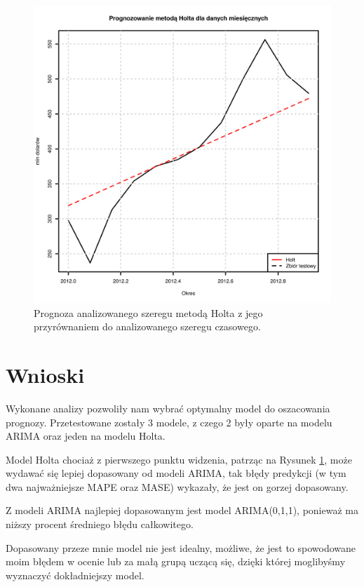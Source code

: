 \documentclass[11pt]{article}
\begin{document}
\begin{figure}[h]
    \centering
	\includegraphics[width=\textwidth]{images/holt.png}
    \caption{Prognoza analizowanego szeregu metodą Holta z jego przyrównaniem do analizowanego szeregu czasowego.}
    \label{fig:holt}

\end{figure}

\newpage

\section{Wnioski}

Wykonane analizy pozwoliły nam wybrać optymalny model do oszacowania prognozy. Przetestowane zostały 3 modele, z czego 2 były oparte na modelu ARIMA oraz jeden na modelu Holta.

Model Holta chociaż z pierwszego punktu widzenia, patrząc na Rysunek \ref{fig:holt}, może wydawać się lepiej dopasowany od modeli ARIMA, tak błędy predykcji (w tym dwa najważniejsze MAPE oraz MASE) wykazały, że jest on gorzej dopasowany.

Z modeli ARIMA najlepiej dopasowanym jest model ARIMA(0,1,1), ponieważ ma niższy procent średniego błędu całkowitego. 

Dopasowany przeze mnie model nie jest idealny, możliwe, że jest to spowodowane moim błędem w ocenie lub za małą grupą uczącą się, dzięki której moglibyśmy wyznaczyć dokładniejszy model.



\clearpage

\listoffigures

\listoftables
\end{document}

